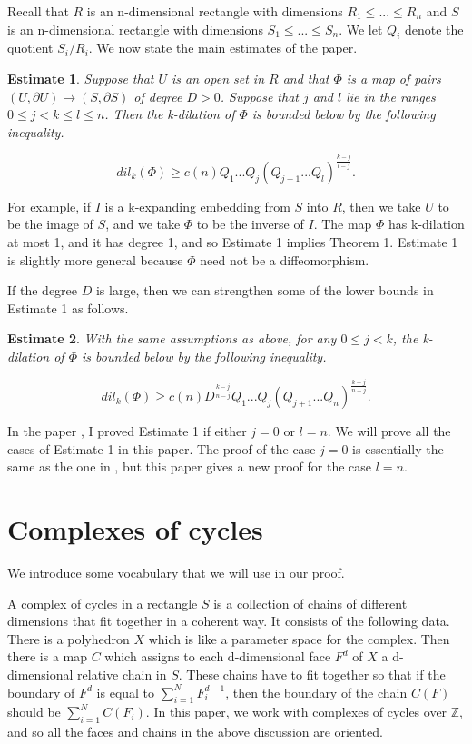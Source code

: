\documentclass{amsart}
\newtheorem*{Theorem 1}{Theorem 1}
\newtheorem*{Theorem 2}{Theorem 2}
\newtheorem{estimate}{Estimate}
\newtheorem*{Estimate 1}{Estimate 1}
\newtheorem*{Estimate 2}{Estimate 2}
\newtheorem*{key lemma}{Key Lemma}
\numberwithin{equation}{section}
\begin{document}
Recall that $R$ is an n-dimensional rectangle with dimensions
$R_1 \le ... \le R_n$ and $S$ is an n-dimensional rectangle with
dimensions $S_1 \le ... \le S_n$.  We let $Q_i$ denote the
quotient $S_i / R_i$.  We now state the main estimates of the
paper.

\begin{estimate} Suppose that $U$ is an open set in $R$ and that
$\Phi$ is a map of pairs $(U, \partial U) \rightarrow (S,
\partial S)$ of degree $D > 0$.  Suppose that $j$ and $l$ lie in
the ranges $0 \le j < k \le l \le n$.  Then the k-dilation of
$\Phi$ is bounded below by the following inequality.

$$dil_k(\Phi) \ge c(n) Q_1 ... Q_j (Q_{j+1} ...
Q_l)^{\frac{k-j}{l-j}}.$$

\end{estimate}

For example, if $I$ is a k-expanding embedding from $S$ into $R$,
then we take $U$ to be the image of $S$, and we take $\Phi$ to be
the inverse of $I$.  The map $\Phi$ has k-dilation at most 1, and
it has degree 1, and so Estimate 1 implies Theorem 1.  Estimate 1
is slightly more general because $\Phi$ need not be a
diffeomorphism. 

If the degree $D$ is large, then we can strengthen some of the
lower bounds in Estimate 1 as follows.

\begin{estimate} With the same assumptions as above, for any $0
\le j < k$, the k-dilation of $\Phi$ is bounded below by the
following inequality.

$$dil_k(\Phi) \ge c(n) D^{\frac{k-j}{n-j}} Q_1 ... Q_j (Q_{j+1}
... Q_n)^{\frac{k-j}{n-j}}.$$

\end{estimate}

In the paper \cite{G1}, I proved Estimate 1 if either $j=0$ or
$l=n$.  We will prove all the cases of Estimate 1 in this paper. 
The proof of the case $j=0$ is essentially the same as the one in
\cite{G1}, but this paper gives a new proof for the case $l=n$.

\section{Complexes of cycles}

We introduce some vocabulary that we will use in our proof.

A complex of cycles in a rectangle $S$ is a collection of chains
of different dimensions that fit together in a coherent way.  It
consists of the following data.  There is a polyhedron $X$ which
is like a parameter space for the complex. Then there is a map
$C$ which assigns to each d-dimensional face $F^d$ of $X$ a
d-dimensional relative chain in $S$.  These chains have to fit
together so that if the boundary of $F^d$ is equal to
$\sum_{i=1}^N F^{d-1}_i$, then the boundary of the chain $C(F)$
should be $\sum_{i=1}^N C(F_i)$.  In this paper, we work with
complexes of cycles over $\mathbb{Z}$, and so all the faces and
chains in the above discussion are oriented.
\end{document}

